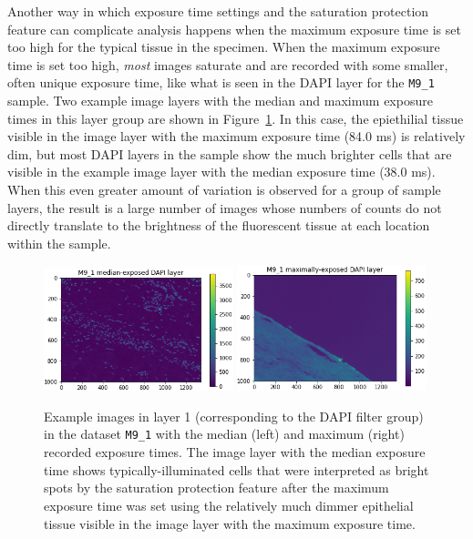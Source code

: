 \documentclass[letterpaper,11pt]{article}
\newcommand{\reffig}[1]{Figure~\ref{#1}}
\begin{document}
Another way in which exposure time settings and the saturation protection feature can complicate analysis happens when the maximum exposure time is set too high for the typical tissue in the specimen. When the maximum exposure time is set too high, \textit{most} images saturate and are recorded with some smaller, often unique exposure time, like what is seen in the DAPI layer for the \texttt{M9\_1} sample. Two example image layers with the median and maximum exposure times in this layer group are shown in \reffig{fig:med_min_M9_1_dapi_images}. In this case, the epiethilial tissue visible in the image layer with the maximum exposure time (84.0 ms) is relatively dim, but most DAPI layers in the sample show the much brighter cells that are visible in the example image layer with the median exposure time (38.0 ms). When this even greater amount of variation is observed for a group of sample layers, the result is a large number of images whose numbers of counts do not directly translate to the brightness of the fluorescent tissue at each location within the sample.

\begin{figure}[!ht]
\centering
\includegraphics[width=0.49\textwidth]{images/introduction/med_exposure_M9_1_dapi_image}
\includegraphics[width=0.49\textwidth]{images/introduction/max_exposure_M9_1_dapi_image}
\caption{\footnotesize Example images in layer 1 (corresponding to the DAPI filter group) in the dataset \texttt{M9\_1} with the median (left) and maximum (right) recorded exposure times. The image layer with the median exposure time shows typically-illuminated cells that were interpreted as bright spots by the saturation protection feature after the maximum exposure time was set using the relatively much dimmer epithelial tissue visible in the image layer with the maximum exposure time.}
\label{fig:med_min_M9_1_dapi_images}
\end{figure}
\end{document}
